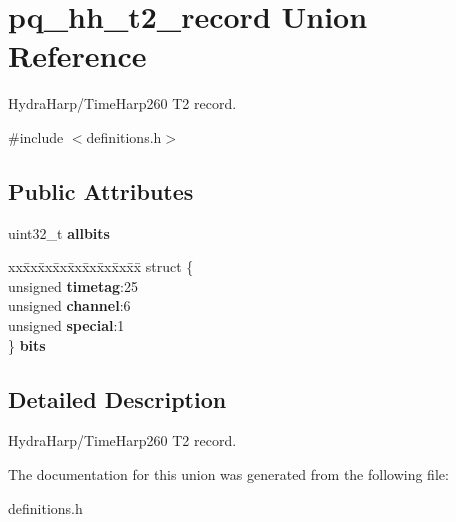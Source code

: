 \hypertarget{unionpq__hh__t2__record}{}\section{pq\+\_\+hh\+\_\+t2\+\_\+record Union Reference}
\label{unionpq__hh__t2__record}


Hydra\+Harp/\+Time\+Harp260 T2 record.  




{\ttfamily \#include $<$definitions.\+h$>$}

\subsection*{Public Attributes}
\begin{DoxyCompactItemize}
\item 
\mbox{\label{unionpq__hh__t2__record_a69da013f76f986d29c6060c45e6583f6}} 
uint32\+\_\+t {\bfseries allbits}
\item 
\mbox{\label{unionpq__hh__t2__record_af182472ea9a12b7a698e35d1968024c5}} 
\begin{tabbing}
xx\=xx\=xx\=xx\=xx\=xx\=xx\=xx\=xx\=\kill
struct \{\\
\>unsigned {\bfseries timetag}:25\\
\>unsigned {\bfseries channel}:6\\
\>unsigned {\bfseries special}:1\\
\} {\bfseries bits}\\

\end{tabbing}\end{DoxyCompactItemize}


\subsection{Detailed Description}
Hydra\+Harp/\+Time\+Harp260 T2 record. 

The documentation for this union was generated from the following file\+:\begin{DoxyCompactItemize}
\item 
definitions.\+h\end{DoxyCompactItemize}
